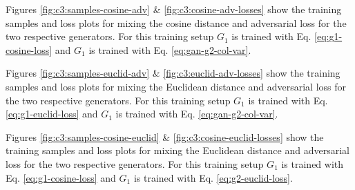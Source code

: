 Figures \ref{fig:c3:samples-cosine-adv} \& \ref{fig:c3:cosine-adv-losses} show the training samples and loss plots for mixing the cosine distance and adversarial loss for the two respective generators. 
For this training setup $G_{1}$ is trained with Eq. \ref{eq:g1-cosine-loss} and $G_{1}$ is trained with Eq. \ref{eq:gan-g2-col-var}.

Figures \ref{fig:c3:samples-euclid-adv} \& \ref{fig:c3:euclid-adv-losses} show the training samples and loss plots for mixing the Euclidean distance and adversarial loss for the two respective generators. 
For this training setup $G_{1}$ is trained with Eq. \ref{eq:g1-euclid-loss} and $G_{1}$ is trained with Eq. \ref{eq:gan-g2-col-var}.

Figures \ref{fig:c3:samples-cosine-euclid} \& \ref{fig:c3:cosine-euclid-losses} show the training samples and loss plots for mixing the Euclidean distance and adversarial loss for the two respective generators. 
For this training setup $G_{1}$ is trained with Eq. \ref{eq:g1-cosine-loss} and $G_{1}$ is trained with Eq. \ref{eq:g2-euclid-loss}.

